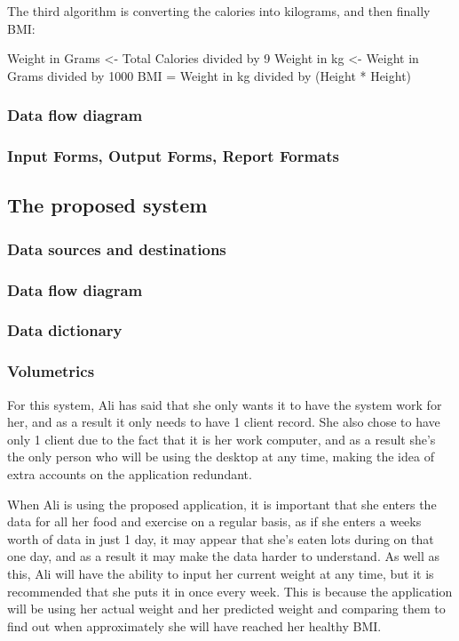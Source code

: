 The third algorithm is converting the calories into kilograms, and then finally BMI:

Weight in Grams <- Total Calories divided by 9
Weight in kg <- Weight in Grams divided by 1000
BMI = Weight in kg divided by (Height * Height)

\subsubsection{Data flow diagram}

\subsubsection{Input Forms, Output Forms, Report Formats}

\subsection{The proposed system}

\subsubsection{Data sources and destinations}

\subsubsection{Data flow diagram}

\subsubsection{Data dictionary}

\subsubsection{Volumetrics}
For this system, Ali has said that she only wants it to have the system work for her, and as a result it only needs to have 1 client record. She also chose to have only 1 client due to the fact that it is her work computer, and as a result she's the only person who will be using the desktop at any time, making the idea of extra accounts on the application redundant.

When Ali is using the proposed application, it is important that she enters the data for all her food and exercise on a regular basis, as if she enters a weeks worth of data in just 1 day, it may appear that she's eaten lots during on that one day, and as a result it may make the data harder to understand. As well as this, Ali will have the ability to input her current weight at any time, but it is recommended that she puts it in once every week. This is because the application will be using her actual weight and her predicted weight and comparing them to find out when approximately she will have reached her healthy BMI.

